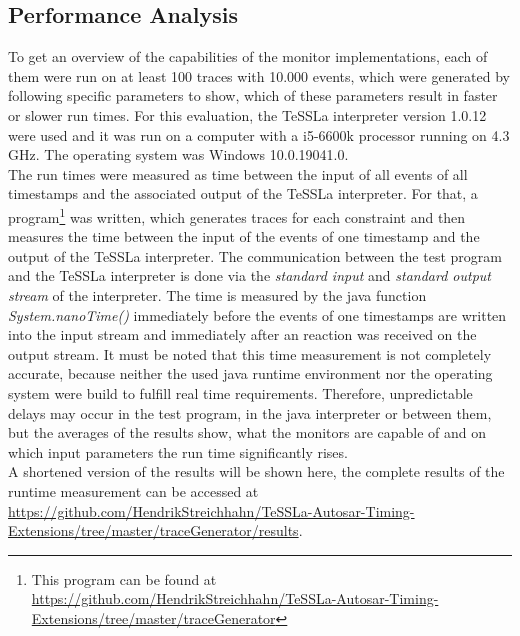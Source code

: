 \subsection{Performance Analysis}
\label{sec:performance}
To get an overview of the capabilities of the monitor implementations, each of them were run on at least 100 traces with 10.000 events, which were generated by following specific parameters to show, which of these parameters result in faster or slower run times. For this evaluation, the TeSSLa interpreter version 1.0.12 were used and it was run on a computer with a i5-6600k processor running on 4.3 GHz. The operating system was Windows 10.0.19041.0.\\
The run times were measured as time between the input of all events of all timestamps and the associated output of the TeSSLa interpreter. For that, a program\footnote{This program can be found at \href{https://github.com/HendrikStreichhahn/TeSSLa-Autosar-Timing-Extensions/tree/master/traceGenerator}{https://github.com/HendrikStreichhahn/TeSSLa-Autosar-Timing-Extensions/tree/master/traceGenerator}} was written, which generates traces for each constraint and then measures the time between the input of the events of one timestamp and the output of the TeSSLa interpreter. The communication between the test program and the TeSSLa interpreter is done via the \textit{standard input} and \textit{standard output stream} of the interpreter. The time is measured by the java function \textit{System.nanoTime()} immediately before the events of one timestamps are written into the input stream and immediately after an reaction was received on the output stream. It must be noted that this time measurement is not completely accurate, because neither the used java runtime environment nor the operating system were build to fulfill real time requirements. Therefore, unpredictable delays may occur in the test program, in the java interpreter or between them, but the averages of the results show, what the monitors are capable of and on which input parameters the run time significantly rises.\\
A shortened version of the results will be shown here, the complete results of the runtime measurement can be accessed at \href{https://github.com/HendrikStreichhahn/TeSSLa-Autosar-Timing-Extensions/tree/master/traceGenerator/results}{https://github.com/HendrikStreichhahn/TeSSLa-Autosar-Timing-Extensions/tree/master/traceGenerator/results}.



